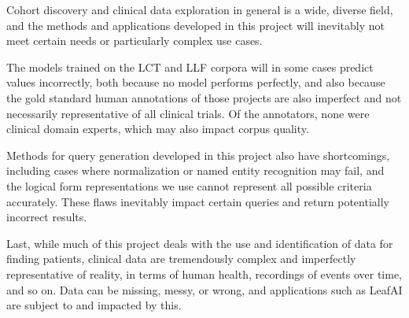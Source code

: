 \documentclass[../main.tex]{subfiles}
\begin{document}
Cohort discovery and clinical data exploration in general is a wide, diverse field, and the methods and applications developed in this project will inevitably not meet certain needs or particularly complex use cases. 

The models trained on the LCT and LLF corpora will in some cases predict values incorrectly, both because no model performs perfectly, and also because the gold standard human annotations of those projects are also imperfect and not necessarily representative of all clinical trials. Of the annotators, none were clinical domain experts, which may also impact corpus quality.

Methods for query generation developed in this project also have shortcomings, including cases where normalization or named entity recognition may fail, and the logical form representations we use cannot represent all possible criteria accurately. These flaws inevitably impact certain queries and return potentially incorrect results.

Last, while much of this project deals with the use and identification of data for finding patients, clinical data are tremendously complex and imperfectly representative of reality, in terms of human health, recordings of events over time, and so on. Data can be missing, messy, or wrong, and applications such as LeafAI are subject to and impacted by this.
\end{document}

